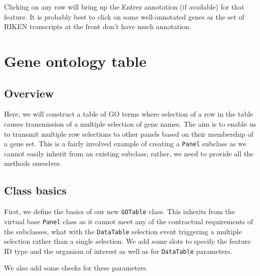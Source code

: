 \documentclass[
]{book}
\begin{document}
Clicking on any row will bring up the Entrez annotation (if available) for that feature.
It is probably best to click on some well-annotated genes as the set of RIKEN transcripts at the front don't have much annotation.

\hypertarget{gene-ontology-table}{%
\chapter{Gene ontology table}\label{gene-ontology-table}}

\hypertarget{overview}{%
\section{Overview}\label{overview}}

Here, we will construct a table of GO terms where selection of a row in the table
causes transmission of a multiple selection of gene names.
The aim is to enable us to transmit multiple row selections to other panels based on their membership of a gene set.
This is a fairly involved example of creating a \texttt{Panel} subclass as we cannot easily inherit from an existing subclass;
rather, we need to provide all the methods ourselves.

\hypertarget{class-basics}{%
\section{Class basics}\label{class-basics}}

First, we define the basics of our new \texttt{GOTable} class.
This inherits from the virtual base \texttt{Panel} class as it cannot meet any of the contractual requirements of the subclasses,
what with the \texttt{DataTable} selection event triggering a multiple selection rather than a single selection.
We add some slots to specify the feature ID type and the organism of interest as well as for \texttt{DataTable} parameters.

We also add some checks for these parameters.
\end{document}

